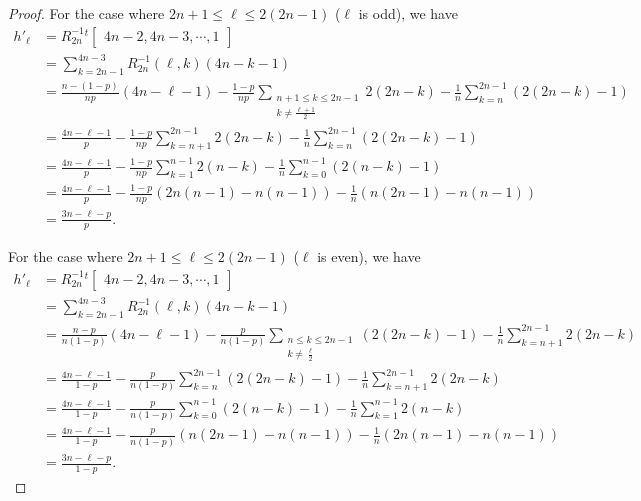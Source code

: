 \documentclass[12pt, leqno]{amsart}
\numberwithin{equation}{section}
\theoremstyle{plain}
\theoremstyle{definition}
\newcommand{\0}{\mathbf{0}}
\begin{document}
\begin{proof}
For the case where $2n+1\leq \ell\leq 2(2n-1)$ ($\ell$ is odd), we have
\begin{align*}
h'_\ell&=
R_{2n}^{-1}{}^t
\begin{bmatrix}
4n-2, 4n-3, \cdots, 1
\end{bmatrix} \\
&=\sum_{k=2n-1}^{4n-3}R_{2n}^{-1}(\ell,k)(4n-k-1)\\
&=\frac{n-(1-p)}{np}(4n-\ell-1)-\frac{1-p}{np}\sum_{\substack{n+1\leq k\leq 2n-1 \\ k\neq\frac{\ell+1}{2}}}2(2n-k)-\frac{1}{n}\sum_{k=n}^{2n-1}(2(2n-k)-1)\\
&=\frac{4n-\ell-1}{p}-\frac{1-p}{np}\sum_{k=n+1}^{2n-1}2(2n-k)-\frac{1}{n}\sum_{k=n}^{2n-1}(2(2n-k)-1)\\
&=\frac{4n-\ell-1}{p}-\frac{1-p}{np}\sum_{k=1}^{n-1}2(n-k)-\frac{1}{n}\sum_{k=0}^{n-1}(2(n-k)-1)\\
&=\frac{4n-\ell-1}{p}-\frac{1-p}{np}(2n(n-1)-n(n-1))-\frac{1}{n}(n(2n-1)-n(n-1))\\
&=\frac{3n-\ell-p}{p}.
\end{align*}

For the case where $2n+1\leq \ell\leq 2(2n-1)$ ($\ell$ is even), we have
\begin{align*}
h'_\ell&=
R_{2n}^{-1}{}^t
\begin{bmatrix}
4n-2, 4n-3, \cdots, 1
\end{bmatrix} \\
&=\sum_{k=2n-1}^{4n-3}R_{2n}^{-1}(\ell,k)(4n-k-1)\\
&=\frac{n-p}{n(1-p)}(4n-\ell-1)-\frac{p}{n(1-p)}\sum_{\substack{n\leq k\leq 2n-1 \\ k\neq\frac{\ell}{2}}}(2(2n-k)-1)-\frac{1}{n}\sum_{k=n+1}^{2n-1}2(2n-k)\\
&=\frac{4n-\ell-1}{1-p}-\frac{p}{n(1-p)}\sum_{k=n}^{2n-1}(2(2n-k)-1)-\frac{1}{n}\sum_{k=n+1}^{2n-1}2(2n-k)\\
&=\frac{4n-\ell-1}{1-p}-\frac{p}{n(1-p)}\sum_{k=0}^{n-1}(2(n-k)-1)-\frac{1}{n}\sum_{k=1}^{n-1}2(n-k)\\
&=\frac{4n-\ell-1}{1-p}-\frac{p}{n(1-p)}(n(2n-1)-n(n-1))-\frac{1}{n}(2n(n-1)-n(n-1))\\
&=\frac{3n-\ell-p}{1-p}.
\end{align*}
\end{proof}
\end{document}
